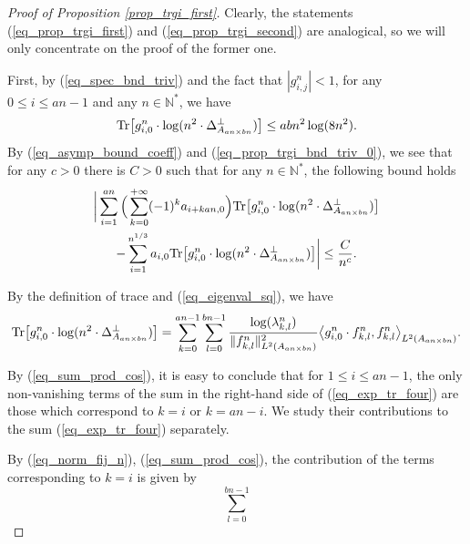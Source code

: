 \documentclass[12pt]{article}
\numberwithin{equation}{section}
\theoremstyle{theorem}
\theoremstyle{definition}
\theoremstyle{remark}
\newcommand{\nat}{\mathbb{N}}
\newcommand{\laplcomp}{\Delta}
\newcommand{\tr}[1]{{\rm{Tr}} \big[ #1 \big]}
\newcommand{\scal}[2]{\big< #1, #2 \big>}
\begin{document}
		\begin{proof}[Proof of Proposition \ref{prop_trgi_first}]
			Clearly, the statements (\ref{eq_prop_trgi_first}) and  (\ref{eq_prop_trgi_second}) are analogical, so we will only concentrate on the proof of the former one.
			\par 
			First, by (\ref{eq_spec_bnd_triv}) and the fact that $|g_{i, j}^{n}| < 1$, for any $0 \leq i \leq an - 1$ and any $n \in \nat^*$, we have
			\begin{equation}\label{eq_prop_trgi_bnd_triv_0}
				\tr{g_{i, 0}^{n} \cdot \log (n^2 \cdot \laplcomp_{A_{an \times bn}}^{\perp})} \leq ab n^2 \log(8n^2).
			\end{equation}
			By (\ref{eq_asymp_bound_coeff}) and (\ref{eq_prop_trgi_bnd_triv_0}), we see that for any $c > 0$ there is $C > 0$ such that for any $n \in \nat^*$, the following bound holds
			\begin{multline}\label{eq_prop_trgi_bnd_triv_1}
				\bigg|
					\sum_{i = 1}^{an} \Big( \sum_{k = 0}^{+\infty} (-1)^k a_{i + kan, 0} \Big) \tr{g_{i, 0}^{n} \cdot \log (n^2 \cdot \laplcomp_{A_{an \times bn}}^{\perp})} 
					\\
					-
					\sum_{i = 1}^{n^{1/3}} a_{i, 0} \tr{g_{i, 0}^{n} \cdot \log (n^2 \cdot \laplcomp_{A_{an \times bn}}^{\perp})}
				\bigg|
				\leq
				\frac{C}{n^c}.
			\end{multline}
			\par By the definition of trace and (\ref{eq_eigenval_sq}), we have
			\begin{equation}\label{eq_exp_tr_four}
				\tr{g_{i, 0}^{n} \cdot \log (n^2 \cdot \laplcomp_{A_{an \times bn}}^{\perp})}
				=
				\sum_{k = 0}^{an - 1} \sum_{l = 0}^{bn - 1} 
				\frac{ \log(\lambda_{k, l}^{n})}{\| f^{n}_{k, l} \|_{L^2(A_{an \times bn})}^{2}}
				\scal{g^{n}_{i, 0} \cdot f^{n}_{k, l}}{f^{n}_{k, l}}_{L^2(A_{an \times bn})}.
			\end{equation}
			\par By (\ref{eq_sum_prod_cos}), it is easy to conclude that for $1 \leq i \leq an - 1$, the only non-vanishing terms of the sum in the right-hand side of (\ref{eq_exp_tr_four}) are those which correspond to $k = i$ or $k = an - i$.
			We study their contributions to the sum (\ref{eq_exp_tr_four}) separately.
			\par 
			By (\ref{eq_norm_fij_n}), (\ref{eq_sum_prod_cos}), the contribution of the terms corresponding to $k = i$ is given by
			\begin{equation}\label{eq_exp_tr_four_aux1}
				\sum_{l = 0}^{bn - 1} 

\end{equation}
\end{proof}
\end{document}

